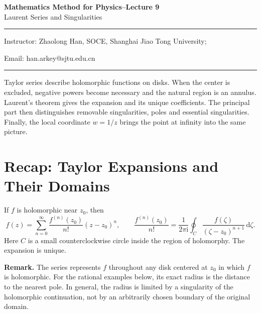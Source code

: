\documentclass[11pt,a4paper]{article}
\theoremstyle{definition}
\theoremstyle{plain}
\newcommand{\dd}{\,\mathrm{d}}
\begin{document}
\begin{center}
    {\LARGE \textbf{Mathematics Method for Physics--Lecture 9}} \\[0.6em]
    {\large Laurent Series and Singularities}
\end{center}

\vspace{-0.5em}
\noindent\rule{\textwidth}{0.5pt}
\vspace{0.3em}

\begin{center}
    Instructor: Zhaolong Han, SOCE, Shanghai Jiao Tong University;
\end{center}

\vspace{-0.6em}
\noindent Email: han.arkey@sjtu.edu.cn

\vspace{0.4em}
\noindent\rule{\textwidth}{0.5pt}

\vspace{0.8em}

Taylor series describe holomorphic functions on disks. When the
center is excluded, negative powers become necessary and the natural
region is an annulus. Laurent's theorem gives the expansion and its
unique coefficients. The principal part then distinguishes removable
singularities, poles and essential singularities. Finally, the local
coordinate $w=1/z$ brings the point at infinity into the same picture.

\section{Recap: Taylor Expansions and Their Domains}
If $f$ is holomorphic near $z_0$, then
\begin{equation}\label{eq:01}
f(z)=\sum_{n=0}^{\infty}\frac{f^{(n)}(z_0)}{n!}(z-z_0)^n,
 \qquad
 \frac{f^{(n)}(z_0)}{n!}
  =\frac1{2\pi \mathrm{i}}\oint_C
             \frac{f(\zeta)}{(\zeta-z_0)^{n+1}}\dd\zeta.
\end{equation}
Here $C$ is a small counterclockwise circle inside the region of
holomorphy. The expansion is unique.

\textbf{Remark.} The series represents $f$ throughout any disk centered at $z_0$ in which
$f$ is holomorphic. For the rational examples below, its exact radius is
the distance to the nearest pole. In general, the radius is limited by a
singularity of the holomorphic continuation, not by an arbitrarily chosen
boundary of the original domain.
\end{document}
